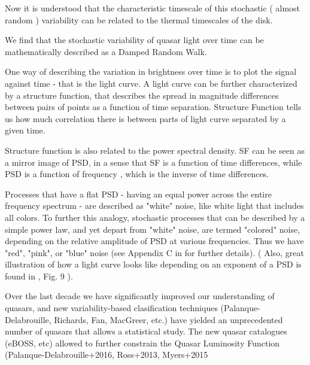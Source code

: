\documentclass[modern]{aastex62}
\begin{document}
Now it is understood that the characteristic timescale of this stochastic ( almost random ) variability can be related to the thermal timescales of the disk. 


We find that the stochastic variability of quasar light over time can be mathematically described as a Damped Random Walk. 

One way of describing the variation in brightness over time is to plot the signal against time - that is the light curve.  A light curve can be further characterized by a structure function, that describes the spread in magnitude differences between pairs of points as a function of time separation. Structure Function tells us how much correlation there is between parts of light curve separated by a given time.  

Structure function is also related to the power spectral density. SF can be seen as a mirror image of PSD, in a sense that SF is a function of time differences, while PSD is a function of frequency , which is the inverse of  time differences. 

Processes that have a flat PSD - having an equal power across the entire frequency spectrum -  are described as "white" noise, like white light that includes all colors. To further this analogy, stochastic processes that can be described by a simple power law, and yet depart from "white" noise, are termed  "colored" noise, depending on the relative amplitude of PSD at various frequencies. Thus we have "red", "pink", or "blue" noise   (see Appendix  C in \cite{kasliwal2017} for further details). ( Also, great illustration of how a light curve looks like depending on an exponent of a PSD is found in \cite{macleod2010}, Fig. 9 ). 


Over the last decade we have significantly improved our understanding of quasars, and new variability-based clasification techniques (Palanque-Delabrouille,  Richards,  Fan,  MacGreer, etc.) have yielded an unprecedented number of quasars that allows a statistical study. The new quasar catalogues (eBOSS, etc) allowed  to further constrain the Quasar Luminosity Function (Palanque-Delabrouille+2016, Ross+2013, Myers+2015 
\end{document}
